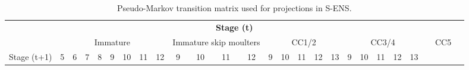 \documentclass[11pt]{article}
\begin{document}
\begin{landscape}

\begin{table}[!tbp]
 \caption{Pseudo-Markov transition matrix used for projections in S-ENS.\label{tm.sens}} 
 \begin{center}
\begin{scriptsize}
 \begin{tabular}{llllllllllllllllllllllllllll}\hline\hline
\multicolumn{28}{c}{\bfseries Stage (t)}
\\ 
\multicolumn{1}{c}{ }&
\multicolumn{8}{c}{Immature}&
\multicolumn{4}{c}{Immature skip moulters}&
\multicolumn{5}{c}{CC1/2}&
\multicolumn{5}{c}{CC3/4}&
\multicolumn{5}{c}{CC5}
\\
\multicolumn{1}{c}{Stage (t+1)}&
\multicolumn{1}{c}{5}&
\multicolumn{1}{c}{6}&
\multicolumn{1}{c}{7}&
\multicolumn{1}{c}{8}&
\multicolumn{1}{c}{9}&
\multicolumn{1}{c}{10}&
\multicolumn{1}{c}{11}&
\multicolumn{1}{c}{12}&
\multicolumn{1}{c}{9}&
\multicolumn{1}{c}{10}&
\multicolumn{1}{c}{11}&
\multicolumn{1}{c}{12}&
\multicolumn{1}{c}{9}&
\multicolumn{1}{c}{10}&
\multicolumn{1}{c}{11}&
\multicolumn{1}{c}{12}&
\multicolumn{1}{c}{13}&
\multicolumn{1}{c}{9}&
\multicolumn{1}{c}{10}&
\multicolumn{1}{c}{11}&
\multicolumn{1}{c}{12}&
\multicolumn{1}{c}{13}

\\ \hline


\end{tabular}
\end{scriptsize}
\end{center}
\end{table}
\end{landscape}
\end{document}

